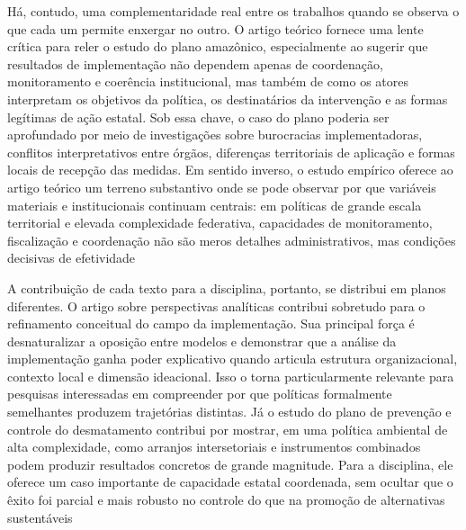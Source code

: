 \documentclass[12pt,a4paper]{article}
\begin{document}
Há, contudo, uma complementaridade real entre os trabalhos quando se observa o que cada um permite enxergar no outro. O artigo teórico fornece uma lente crítica para reler o estudo do plano amazônico, especialmente ao sugerir que resultados de implementação não dependem apenas de coordenação, monitoramento e coerência institucional, mas também de como os atores interpretam os objetivos da política, os destinatários da intervenção e as formas legítimas de ação estatal. Sob essa chave, o caso do plano poderia ser aprofundado por meio de investigações sobre burocracias implementadoras, conflitos interpretativos entre órgãos, diferenças territoriais de aplicação e formas locais de recepção das medidas. Em sentido inverso, o estudo empírico oferece ao artigo teórico um terreno substantivo onde se pode observar por que variáveis materiais e institucionais continuam centrais: em políticas de grande escala territorial e elevada complexidade federativa, capacidades de monitoramento, fiscalização e coordenação não são meros detalhes administrativos, mas condições decisivas de efetividade \parencite{ascenzi2013_implementacao_politicas,mello2017_evolucao_plano}

A contribuição de cada texto para a disciplina, portanto, se distribui em planos diferentes. O artigo sobre perspectivas analíticas contribui sobretudo para o refinamento conceitual do campo da implementação. Sua principal força é desnaturalizar a oposição entre modelos e demonstrar que a análise da implementação ganha poder explicativo quando articula estrutura organizacional, contexto local e dimensão ideacional. Isso o torna particularmente relevante para pesquisas interessadas em compreender por que políticas formalmente semelhantes produzem trajetórias distintas. Já o estudo do plano de prevenção e controle do desmatamento contribui por mostrar, em uma política ambiental de alta complexidade, como arranjos intersetoriais e instrumentos combinados podem produzir resultados concretos de grande magnitude. Para a disciplina, ele oferece um caso importante de capacidade estatal coordenada, sem ocultar que o êxito foi parcial e mais robusto no controle do que na promoção de alternativas sustentáveis \parencite{ascenzi2013_implementacao_politicas,mello2017_evolucao_plano}
\end{document}
